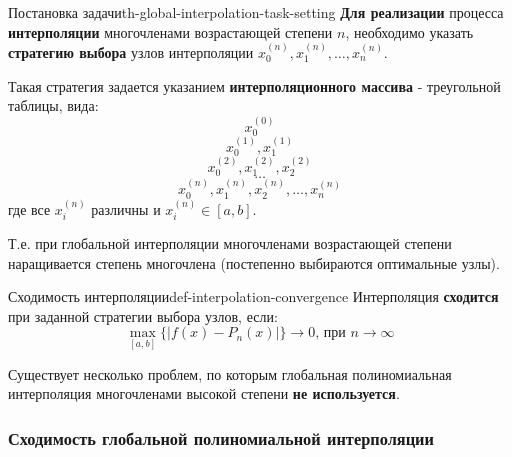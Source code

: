 \documentclass[14pt]{extarticle}
\begin{document}
        \begin{theorem}{Постановка задачи}{th-global-interpolation-task-setting}
            \textbf{Для реализации} процесса \textbf{интерполяции} многочленами возрастающей степени $n$, необходимо указать \textbf{стратегию выбора} узлов интерполяции $x_{0}^{(n)}, x_{1}^{(n)}, \ldots, x_{n}^{(n)}$.

            \vspace{\baselineskip}

            Такая стратегия задается указанием \textbf{интерполяционного массива} - треугольной таблицы, вида:
            $$x_{0}^{(0)}$$
            $$x_{0}^{(1)}, x_{1}^{(1)}$$
            $$x_{0}^{(2)}, x_{1}^{(2)}, x_{2}^{(2)}$$
            $$\ldots$$
            $$x_{0}^{(n)}, x_{1}^{(n)}, x_{2}^{(n)}, \ldots, x_{n}^{(n)}$$
            где все $x_{i}^{(n)}$ различны и $x_{i}^{(n)} \in [a, b]$.

            \vspace{\baselineskip}

            Т.е. при глобальной интерполяции многочленами возрастающей степени наращивается степень многочлена (постепенно выбираются оптимальные узлы).
        \end{theorem}

        \begin{definition}{Сходимость интерполяции}{def-interpolation-convergence}
            Интерполяция \textbf{сходится} при заданной стратегии выбора узлов, если:
            $$\max_{[a, b]}\{|f(x) - P_{n}(x)|\} \to 0 \text{, при } n \to \infty$$
        \end{definition}

        Существует несколько проблем, по которым глобальная полиномиальная интерполяция многочленами высокой степени \textbf{не используется}.

    \subsubsection{Сходимость глобальной полиномиальной интерполяции}
        
\end{document}
